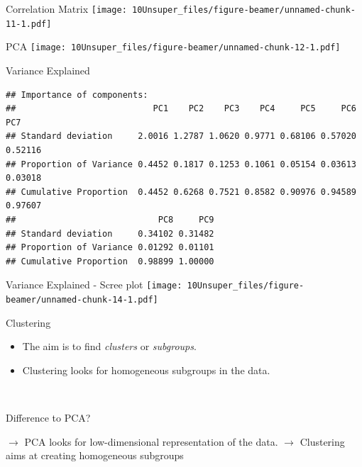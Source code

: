 \documentclass[
  10pt,
  ignorenonframetext,
]{beamer}
\begin{document}
\begin{frame}{Correlation Matrix}
\label{correlation-matrix}
\texttt{[image: 10Unsuper\_files/figure-beamer/unnamed-chunk-11-1.pdf]}
\end{frame}

\begin{frame}{PCA}
\label{pca}
\texttt{[image: 10Unsuper\_files/figure-beamer/unnamed-chunk-12-1.pdf]}
\end{frame}

\begin{frame}[fragile]{Variance Explained}
\label{variance-explained}
\footnotesize

\begin{verbatim}
## Importance of components:
##                           PC1    PC2    PC3    PC4     PC5     PC6     PC7
## Standard deviation     2.0016 1.2787 1.0620 0.9771 0.68106 0.57020 0.52116
## Proportion of Variance 0.4452 0.1817 0.1253 0.1061 0.05154 0.03613 0.03018
## Cumulative Proportion  0.4452 0.6268 0.7521 0.8582 0.90976 0.94589 0.97607
##                            PC8     PC9
## Standard deviation     0.34102 0.31482
## Proportion of Variance 0.01292 0.01101
## Cumulative Proportion  0.98899 1.00000
\end{verbatim}
\end{frame}

\begin{frame}{Variance Explained - Scree plot}
\label{variance-explained---scree-plot}
\texttt{[image: 10Unsuper\_files/figure-beamer/unnamed-chunk-14-1.pdf]}
\end{frame}

\begin{frame}{Clustering}
\label{clustering}
\(~\)

\begin{itemize}
\item
  The aim is to find \emph{clusters} or \emph{subgroups}.
\item
  Clustering looks for homogeneous subgroups in the data.
\end{itemize}

\(~\)

Difference to PCA?

\pause

\(\rightarrow\) PCA looks for low-dimensional representation of the
data. \(\rightarrow\) Clustering aims at creating homogeneous subgroups
\end{frame}
\end{document}

